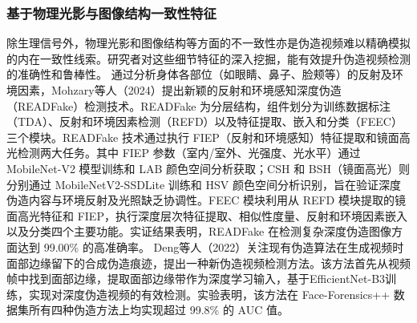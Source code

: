 \documentclass[conference]{IEEEtran}
\begin{document}
\subsubsection{基于物理光影与图像结构一致性特征}
除生理信号外，物理光影和图像结构等方面的不一致性亦是伪造视频难以精确模拟的内在一致性线索。研究者对这些细节特征的深入挖掘，能有效提升伪造视频检测的准确性和鲁棒性。
通过分析身体各部位（如眼睛、鼻子、脸颊等）的反射及环境因素，Mohzary等人（2024）提出新颖的反射和环境感知深度伪造（READFake）检测技术。READFake 为分层结构，组件划分为训练数据标注（TDA）、反射和环境因素检测（REFD）以及特征提取、嵌入和分类（FEEC）三个模块。READFake 技术通过执行 FIEP（反射和环境感知）特征提取和镜面高光检测两大任务。其中 FIEP 参数（室内/室外、光强度、光水平）通过 MobileNet-V2 模型训练和 LAB 颜色空间分析获取；CSH 和 BSH（镜面高光）则分别通过 MobileNetV2-SSDLite 训练和 HSV 颜色空间分析识别，旨在验证深度伪造内容与环境反射及光照缺乏协调性。FEEC 模块利用从 REFD 模块提取的镜面高光特征和 FIEP，执行深度层次特征提取、相似性度量、反射和环境因素嵌入以及分类四个主要功能。实证结果表明，READFake 在检测复杂深度伪造图像方面达到 99.00\% 的高准确率\cite{MohzaryBasunduwah-365}。
Deng等人（2022）关注现有伪造算法在生成视频时面部边缘留下的合成伪造痕迹，提出一种新伪造视频检测方法。该方法首先从视频帧中找到面部边缘，提取面部边缘带作为深度学习输入，基于EfficientNet-B3训练，实现对深度伪造视频的有效检测。实验表明，该方法在 Face-Forensics++ 数据集所有四种伪造方法上均实现超过 99.8\% 的 AUC 值\cite{Z.B.-410}。
\end{document}
